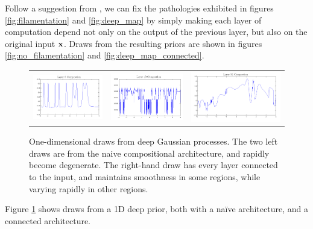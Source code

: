 \documentclass{article}
\begin{document}
Follow a suggestion from \cite{neal1995bayesian}, we can fix the pathologies exhibited in figures \ref{fig:filamentation} and \ref{fig:deep_map} by simply making each layer of computation depend not only on the output of the previous layer, but also on the original input ${\bf{x}}$.  Draws from the resulting priors are shown in figures \ref{fig:no_filamentation} and \ref{fig:deep_map_connected}.
%
\begin{figure}
\centering
\begin{tabular}{ccc}
\includegraphics[width=0.3\columnwidth]{figures/1d_samples/layer6} &
\includegraphics[width=0.3\columnwidth]{figures/1d_samples/composition} &
\includegraphics[width=0.3\columnwidth]{figures/1d_samples/connected} 
\end{tabular}
\caption{One-dimensional draws from deep Gaussian processes.  The two left draws are from the naive compositional architecture, and rapidly become degenerate.  The right-hand draw has every layer connected to the input, and maintains smoothness in some regions, while varying rapidly in other regions.}
\label{fig:deep_draw_1d}
\end{figure}
%
Figure \ref{fig:deep_draw_1d} shows draws from a 1D deep \gp{} prior, both with a na\"{i}ve architecture, and a connected architecture.
\end{document}
